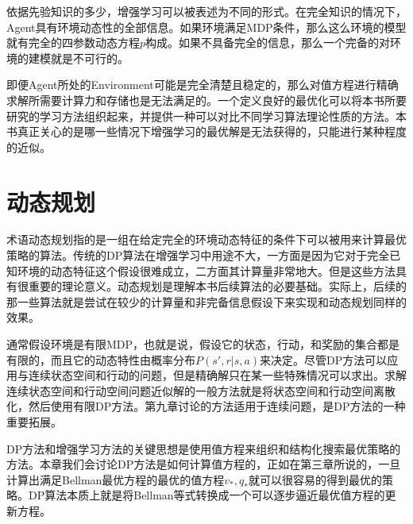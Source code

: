 \documentclass{ctexart}
\begin{document}
            依据先验知识的多少，增强学习可以被表述为不同的形式。在完全知识的情况下，Agent具有环境动态性的全部信息。如果环境满足MDP条件，那么这么环境的模型就有完全的四参数动态方程$p$构成。如果不具备完全的信息，那么一个完备的对环境的建模就是不可行的。

            即便Agent所处的Environment可能是完全清楚且稳定的，那么对值方程进行精确求解所需要计算力和存储也是无法满足的。一个定义良好的最优化可以将本书所要研究的学习方法组织起来，并提供一种可以对比不同学习算法理论性质的方法。本书真正关心的是哪一些情况下增强学习的最优解是无法获得的，只能进行某种程度的近似。

    \section{动态规划}
        术语动态规划指的是一组在给定完全的环境动态特征的条件下可以被用来计算最优策略的算法。传统的DP算法在增强学习中用途不大，一方面是因为它对于完全已知环境的动态特征这个假设很难成立，二方面其计算量非常地大。但是这些方法具有很重要的理论意义。动态规划是理解本书后续算法的必要基础。实际上，后续的那一些算法就是尝试在较少的计算量和非完备信息假设下来实现和动态规划同样的效果。

        通常假设环境是有限MDP，也就是说，假设它的状态，行动，和奖励的集合都是有限的，而且它的动态特性由概率分布$P(s',r|s,a)$来决定。尽管DP方法可以应用与连续状态空间和行动的问题，但是精确解只在某一些特殊情况可以求出。求解连续状态空间和行动空间问题近似解的一般方法就是将状态空间和行动空间离散化，然后使用有限DP方法。第九章讨论的方法适用于连续问题，是DP方法的一种重要拓展。

        DP方法和增强学习方法的关键思想是使用值方程来组织和结构化搜索最优策略的方法。本章我们会讨论DP方法是如何计算值方程的，正如在第三章所说的，一旦计算出满足Bellman最优方程的最优的值方程$v_*,q_*$就可以很容易的得到最优的策略。DP算法本质上就是将Bellman等式转换成一个可以逐步逼近最优值方程的更新方程。
\end{document}
